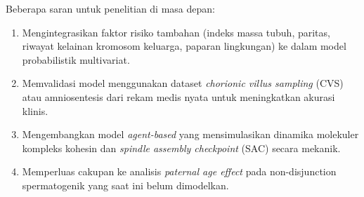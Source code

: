 \documentclass[10pt,a4paper,twocolumn]{article}
\begin{document}
Beberapa saran untuk penelitian di masa depan:

\begin{enumerate}[leftmargin=*,noitemsep,topsep=2pt]
    \item Mengintegrasikan faktor risiko tambahan (indeks massa tubuh, paritas,
        riwayat kelainan kromosom keluarga, paparan lingkungan) ke dalam model
        probabilistik multivariat.
    \item Memvalidasi model menggunakan dataset \textit{chorionic villus sampling}
        (CVS) atau amniosentesis dari rekam medis nyata untuk meningkatkan akurasi klinis.
    \item Mengembangkan model \textit{agent-based} yang mensimulasikan dinamika
        molekuler kompleks kohesin dan \textit{spindle assembly checkpoint} (SAC)
        secara mekanik.
    \item Memperluas cakupan ke analisis \textit{paternal age effect} pada
        non-disjunction spermatogenik yang saat ini belum dimodelkan.
\end{enumerate}
\end{document}
